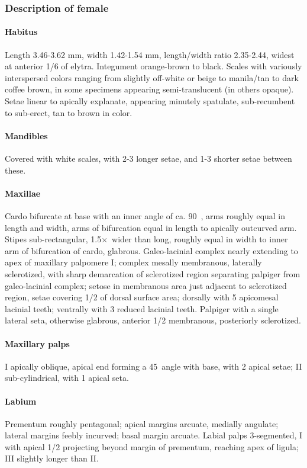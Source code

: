 \documentclass[fleqn,10pt,lineno]{wlpeerj} %
\newcommand{\td}{\textdegree~}
\newcommand{\x}{$\times$~}
\begin{document}
		\subsubsection*{Description of female}
			\paragraph{Habitus}
				Length 3.46-3.62 mm, width 1.42-1.54 mm, length/width ratio 2.35-2.44, widest at anterior 1/6 of elytra.
				Integument orange-brown to black.
				Scales with variously interspersed colors ranging from slightly off-white or beige to manila/tan to dark coffee brown, in some specimens appearing semi-translucent (in others opaque).
				Setae linear to apically explanate, appearing minutely spatulate, sub-recumbent to sub-erect, tan to brown in color.
			\paragraph{Mandibles}
				Covered with white scales, with 2-3 longer setae, and 1-3 shorter setae between these.
			\paragraph{Maxillae}
				Cardo bifurcate at base with an inner angle of ca. 90\td, arms roughly equal in length and width, arms of bifurcation equal in length to apically outcurved arm. 
				Stipes sub-rectangular, 1.5\x wider than long, roughly equal in width to inner arm of bifurcation of cardo, glabrous. 
				Galeo-lacinial complex nearly extending to apex of maxillary palpomere I; complex mesally membranous, laterally sclerotized, with sharp demarcation of sclerotized region separating palpiger from galeo-lacinial complex; setose in membranous area just adjacent to sclerotized region, setae covering 1/2 of dorsal surface area; dorsally with 5 apicomesal lacinial teeth; ventrally with 3 reduced lacinial teeth. 
				Palpiger with a single lateral seta, otherwise glabrous, anterior 1/2 membranous, posteriorly sclerotized.
			\paragraph{Maxillary palps}
				I apically oblique, apical end forming a 45\td angle with base, with 2 apical setae; II sub-cylindrical, with 1 apical seta.
			\paragraph{Labium}
				Prementum roughly pentagonal; apical margins arcuate, medially angulate; lateral margins feebly incurved; basal margin arcuate. 
				Labial palps 3-segmented, I with apical 1/2 projecting beyond margin of prementum, reaching apex of ligula; III slightly
longer than II.
\end{document}
